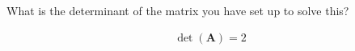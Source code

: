 What is the determinant of the matrix you have set up to solve this?

\begin{solution}
    \begin{align*}
        \det\left(\boldsymbol{A}\right) = 2
    \end{align*}
\end{solution}
